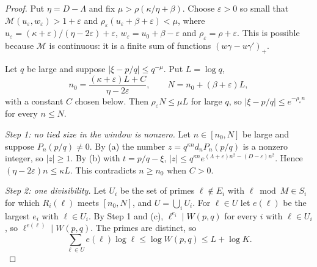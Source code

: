 \documentclass[11pt]{amsart}
\theoremstyle{definition}
\theoremstyle{remark}
\numberwithin{equation}{section}
\newcommand{\cM}{\mathcal M}
\begin{document}
\begin{proof}
Put $\eta=D-\Lambda$ and fix $\mu>\rho(\kappa/\eta+\beta)$. Choose $\varepsilon>0$ so small that
$\cM(u_\varepsilon,w_\varepsilon)>1+\varepsilon$ and $\rho_\varepsilon(u_\varepsilon+\beta+\varepsilon)<\mu$, where
$u_\varepsilon=(\kappa+\varepsilon)/(\eta-2\varepsilon)+\varepsilon$, $w_\varepsilon=u_0+\beta-\varepsilon$ and
$\rho_\varepsilon=\rho+\varepsilon$. This is possible because $\cM$ is continuous: it is a finite sum of functions
$(w\gamma-u\gamma')_+$.

Let $q$ be large and suppose $|\xi-p/q|\le q^{-\mu}$. Put $L=\log q$,
\[
 n_0=\frac{(\kappa+\varepsilon)L+C}{\eta-2\varepsilon},\qquad N=n_0+(\beta+\varepsilon)L,
\]
with a constant $C$ chosen below. Then $\rho_\varepsilon N\le\mu L$ for large $q$, so $|\xi-p/q|\le
e^{-\rho_\varepsilon n}$ for every $n\le N$.

\emph{Step 1: no tied size in the window is nonzero.} Let $n\in[n_0,N]$ be large and suppose $P_n(p/q)\ne0$. By (a)
the number $z=q^{\kappa n}d_nP_n(p/q)$ is a nonzero integer, so $|z|\ge1$. By (b) with $t=p/q-\xi$,
$|z|\le q^{\kappa n}e^{(\Lambda+\varepsilon)n^2-(D-\varepsilon)n^2}$. Hence $(\eta-2\varepsilon)n\le\kappa L$. This
contradicts $n\ge n_0$ when $C>0$.

\emph{Step 2: one divisibility.} Let $U_i$ be the set of primes $\ell\notin E_i$ with $\ell\bmod M\in S_i$ for which
$R_i(\ell)$ meets $[n_0,N]$, and $U=\bigcup_iU_i$. For $\ell\in U$ let $e(\ell)$ be the largest $e_i$ with $\ell\in U_i$. By
Step 1 and (c), $\ell^{e_i}\mid W(p,q)$ for every $i$ with $\ell\in U_i$, so $\ell^{e(\ell)}\mid W(p,q)$. The primes are
distinct, so
\begin{equation}\label{eq:budget}
 \sum_{\ell\in U}e(\ell)\log\ell\le\log W(p,q)\le L+\log K.
\end{equation}


\end{proof}
\end{document}
